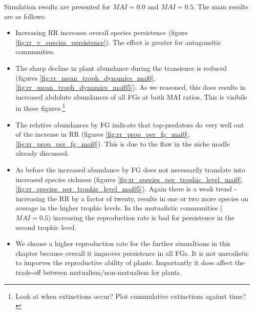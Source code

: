Simulation results are presented for $MAI=0.0$ and $MAI=0.5$. The main results are as follows:

\begin{itemize}
	\item Increasing RR increases overall species persistence (figure \ref{fig:rr_v_species_persistence}). The effect is greater for antagonsitic communities.

	\item The sharp decline in plant abundance during the transience is reduced (figures \ref{fig:rr_mean_troph_dynamics_mai0}, \ref{fig:rr_mean_troph_dynamics_mai05}). As we reasoned, this does results in increased abdolute abundances of all FGs at both MAI ratios. This is visibile in these figures.\footnote{Look at when extinctions occur? Plot cummulative extinctions against time?}
	
	\item The relative abundances by FG indicate that top-predators do very well out of the increase in RR (figures \ref{fig:rr_prop_per_fg_mai0}, \ref{fig:rr_prop_per_fg_mai0}). This is due to the flaw in the niche modle already discussed. 
	
	\item As before the increased abundance by FG does not necessarily translate into increased species richness (figures \ref{fig:rr_species_per_trophic_level_mai0}, \ref{fig:rr_species_per_trophic_level_mai05}). Again there is a weak trend - increasing the RR by a factor of twenty, results in one or two more species on average in the higher trophic levels. In the mutualistic communities ($MAI=0.5$) increasing the reproduction rate is bad for persistence in the second trophic level.
	
	\item We choose a higher reproduction rate for the further simualtions in this chapter because overall it improves persistence in all FGs. It is not unrealistic to imporves the reproductive ability of plants. Importantly it does affect the trade-off between mutualism/non-mutualism for plants.
	
\end{itemize}



